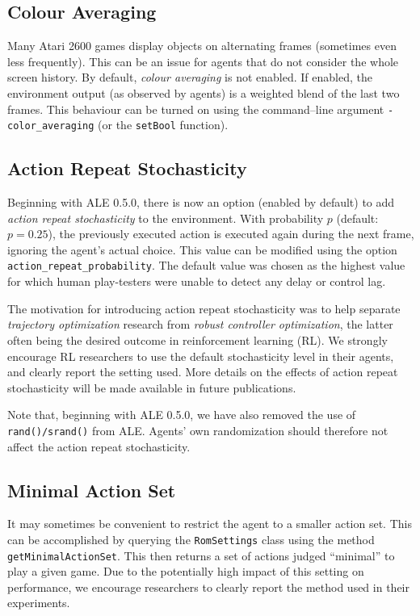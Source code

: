 \documentclass[12pt]{article}
\begin{document}
\subsection{Colour Averaging}

Many Atari 2600 games display objects on alternating frames (sometimes even less frequently).
This can be an issue for agents that do not consider the whole screen history. By default, 
\emph{colour averaging} is not enabled. If enabled, the environment output (as observed by agents)
is a weighted blend of the last two frames. This behaviour can be turned on using the
command--line argument \verb+-color_averaging+ (or the \verb+setBool+ function).

\subsection{Action Repeat Stochasticity}

Beginning with ALE 0.5.0, there is now an option (enabled by default) to add 
\emph{action repeat stochasticity} to the environment. With probability $p$ (default: $p = 0.25$),
the previously executed action is executed again during the next frame, ignoring the agent's
actual choice. This value can be modified using the option \verb+action_repeat_probability+.
The default value was chosen as the highest value for which human play-testers
were unable to detect any delay or control lag.

The motivation for introducing action repeat stochasticity was to help separate \emph{trajectory
optimization} research from \emph{robust controller optimization}, the latter often being the 
desired outcome in reinforcement learning (RL). We strongly encourage RL researchers to use 
the default stochasticity level in their agents, and clearly report the setting used. More 
details on the effects of action repeat stochasticity will be made available in future 
publications.

Note that, beginning with ALE 0.5.0, we have also removed the use of \verb+rand()/srand()+ from
ALE. Agents' own randomization should therefore not affect the action repeat stochasticity.

\subsection{Minimal Action Set}

It may sometimes be convenient to restrict the agent to a smaller action set. This can be
accomplished by querying the \verb+RomSettings+ class using the method 
\verb+getMinimalActionSet+. This then returns a set of actions judged ``minimal'' to play a given
game. Due to the potentially high impact of this setting on performance, we encourage researchers
to clearly report the method used in their experiments. 
\end{document}
